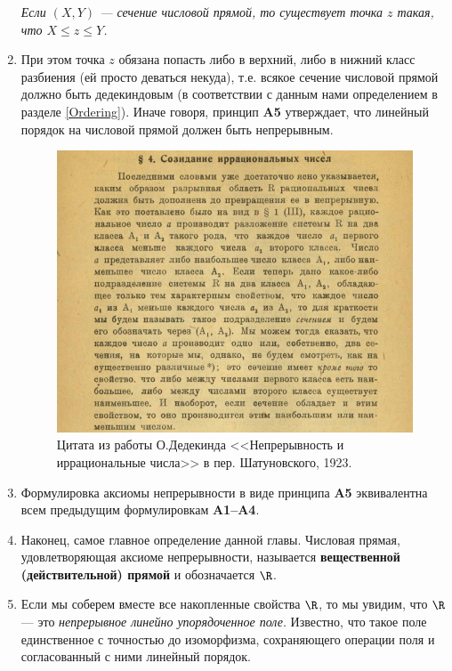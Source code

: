 \begin{enumerate}
\noindent
\textit{Если $(X,Y)$ --- сечение числовой прямой, то существует точка $z$ такая, что $X\le z\le Y$.}
\item При этом точка $z$ обязана попасть либо в верхний, либо в нижний класс разбиения (ей просто деваться некуда), т.е. всякое сечение числовой прямой должно быть дедекиндовым (в соответствии с данным нами определением в разделе \ref{Ordering}). Иначе говоря, принцип \textbf{A5} утверждает, что линейный порядок на числовой прямой должен быть непрерывным.
\begin{figure}
\begin{center}
\includegraphics[scale=0.7]{dedekind.png}
\end{center}
\caption{Цитата из работы О.Дедекинда <<Непрерывность и иррациональные числа>> в пер. Шатуновского, 1923.}
\end{figure}
\item Формулировка аксиомы непрерывности в виде принципа \textbf{A5} эквивалентна всем предыдущим формулировкам \textbf{A1--A4}.
\item Наконец, самое главное определение данной главы. Числовая прямая, удовлетворяющая аксиоме непрерывности, называется \textbf{вещественной (действительной) прямой} и обозначается $\R$.

\item Если мы соберем вместе все накопленные свойства $\R$, то мы увидим, что $\R$ --- это \textit{непрерывное линейно упорядоченное поле}. Известно, что такое поле единственное с точностью до изоморфизма, сохраняющего  операции поля и согласованный с ними линейный порядок.

\end{enumerate}


